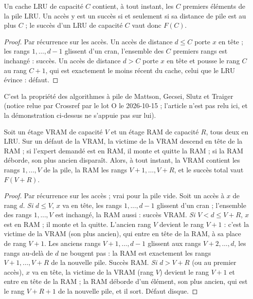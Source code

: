\begin{lemme}\label{t3mim:lem:mattson}
Un cache LRU de capacité $C$ contient, à tout instant, les $C$ premiers éléments de la pile LRU. Un accès y est un succès si et seulement si sa distance de pile est au plus $C$ ; le succès d'un LRU de capacité $C$ vaut donc $F(C)$.
\end{lemme}
\begin{proof}
Par récurrence sur les accès. Un accès de distance $d \le C$ porte $x$ en tête ; les rangs $1, \dots, d-1$ glissent d'un cran, l'ensemble des $C$ premiers rangs est inchangé : succès. Un accès de distance $d > C$ porte $x$ en tête et pousse le rang $C$ au rang $C+1$, qui est exactement le moins récent du cache, celui que le LRU évince : défaut.
\end{proof}
C'est la propriété des algorithmes à pile de Mattson, Gecsei, Slutz et Traiger \cite{mattson1970} (notice relue par Crossref par le lot O le 2026-10-15 ; l'article n'est pas relu ici, et la démonstration ci-dessus ne s'appuie pas sur lui).

\begin{theoreme}\label{t3mim:thm:exclusif}
Soit un étage VRAM de capacité $V$ et un étage RAM de capacité $R$, tous deux en LRU. Sur un défaut de la VRAM, la victime de la VRAM descend en tête de la RAM ; si l'expert demandé est en RAM, il monte et quitte la RAM ; si la RAM déborde, son plus ancien disparaît. Alors, à tout instant, la VRAM contient les rangs $1, \dots, V$ de la pile, la RAM les rangs $V+1, \dots, V+R$, et le succès total vaut $F(V+R)$.
\end{theoreme}
\begin{proof}
Par récurrence sur les accès ; vrai pour la pile vide. Soit un accès à $x$ de rang $d$.
\emph{Si $d \le V$}, $x$ va en tête, les rangs $1, \dots, d-1$ glissent d'un cran ; l'ensemble des rangs $1, \dots, V$ est inchangé, la RAM aussi : succès VRAM.
\emph{Si $V < d \le V + R$}, $x$ est en RAM ; il monte et la quitte. L'ancien rang $V$ devient le rang $V+1$ : c'est la victime de la VRAM (son plus ancien), qui entre en tête de la RAM, à sa place de rang $V+1$. Les anciens rangs $V+1, \dots, d-1$ glissent aux rangs $V+2, \dots, d$, les rangs au-delà de $d$ ne bougent pas : la RAM est exactement les rangs $V+1, \dots, V+R$ de la nouvelle pile. Succès RAM.
\emph{Si $d > V + R$} (ou au premier accès), $x$ va en tête, la victime de la VRAM (rang $V$) devient le rang $V+1$ et entre en tête de la RAM ; la RAM déborde d'un élément, son plus ancien, qui est le rang $V+R+1$ de la nouvelle pile, et il sort. Défaut disque.
\end{proof}

